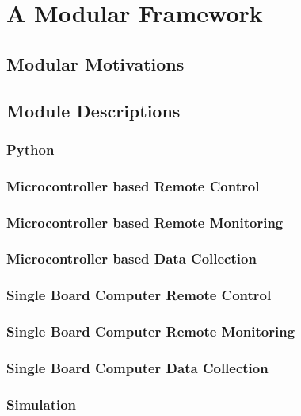 \chapter{A Modular Framework}

\section{Modular Motivations}
\section{Module Descriptions}
    \subsection{Python}
    \subsection{Microcontroller based Remote Control}
    \subsection{Microcontroller based Remote Monitoring}
    \subsection{Microcontroller based Data Collection}
    \subsection{Single Board Computer Remote Control}
    \subsection{Single Board Computer Remote Monitoring}
    \subsection{Single Board Computer Data Collection}
    \subsection{Simulation}
    




